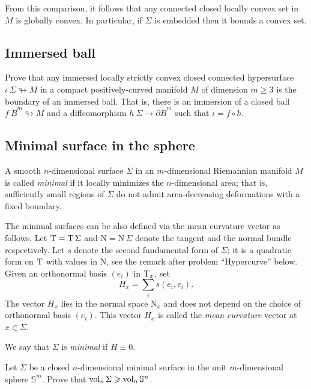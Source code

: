 From this comparison, it follows that any connected closed locally convex set in $M$ is globally convex.
In particular, if $\Sigma$ is embedded then it bounds a convex set.


\subsection*{Immersed ball\hard}
\label{Immersed ball}

\begin{pr}
Prove that any immersed locally strictly convex
closed connected hypersurface $\iota\:\Sigma\looparrowright M$
in a compact positively-curved manifold $M$ of dimension $m\ge 3$ is the boundary of an immersed ball. 
That is, there is an immersion of a closed ball $f\:\bar B^m\looparrowright M$ and a diffeomorphism $h\:\Sigma\to\partial \bar B^m$
such that $\iota=f\circ h$.
\end{pr}

\subsection*{Minimal surface in the sphere}
\label{minimal surface}\label{almgren} 

A  smooth $n$-dimensional surface $\Sigma$ in
an $m$-dimensional Riemannian manifold $M$ is called \emph{minimal}
if it locally minimizes the $n$-dimensional area;
that is, sufficiently small regions of $\Sigma$ do not admit area-decreasing deformations with a fixed boundary.

The minimal surfaces can be also defined via the mean curvature vector as follows.
Let $\mathrm{T}=\mathrm{T}\,\Sigma$ and $\mathrm{N}=\mathrm{N}\,\Sigma$ denote the tangent and the normal bundle respectively.
Let $s$ denote the second fundamental form of $\Sigma$;
it is a quadratic form on $\mathrm{T}$ with values in $\mathrm{N}$,
see the remark after problem ``Hypercurve'' below. 
Given an orthonormal basis $(e_i)$ in $\mathrm{T}_x$, set 
$$H_x=\sum_i s(e_i,e_i).$$
The vector $H_x$ lies in the normal space $\mathrm{N}_x$
and does not depend on the choice of orthonormal basis $(e_i)$.
This vector $H_x$ is called the \emph{mean curvature} vector at $x\in \Sigma$.

We say that $\Sigma$ is \emph{minimal} if $H\equiv 0$.

\begin{pr}
Let $\Sigma$ be a closed $n$-dimensional 
minimal surface
in the unit $m$-dimensional sphere $\mathbb{S}^m$.
Prove that
$\operatorname{\rm vol}\nolimits_n \Sigma\geqslant \operatorname{\rm vol}\nolimits_n \mathbb{S}^n$.
\end{pr}

